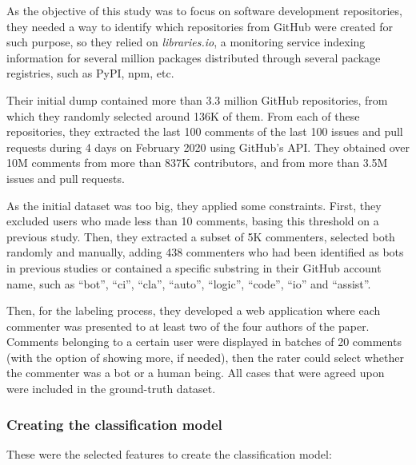 \documentclass[a4paper, 12pt]{book}
\begin{document}
As the objective of this study was to focus on software development repositories, they needed a way to identify which repositories from GitHub were created for such purpose, so they relied on \textit{libraries.io}, a monitoring service indexing information for several million packages distributed through several package registries, such as PyPI, npm, etc. 

Their initial dump contained more than 3.3 million GitHub repositories, from which they randomly selected around 136K of them. From each of these repositories, they extracted the last 100 comments of the last 100 issues and pull requests during 4 days on February 2020 using GitHub's API. They obtained over 10M comments from more than 837K contributors, and from more than 3.5M issues and pull requests.

As the initial dataset was too big, they applied some constraints. First, they excluded users who made less than 10 comments, basing this threshold on a previous study. Then, they extracted a subset of 5K commenters, selected both randomly and manually, adding 438 commenters who had been identified as bots in previous studies or contained a specific substring in their GitHub account name, such as ``bot'', ``ci'', ``cla'', ``auto'', ``logic'', ``code'', ``io'' and ``assist''.

Then, for the labeling process, they developed a web application where each commenter was presented to at least two of the four authors of the paper. Comments belonging to a certain user were displayed in batches of 20 comments (with the option of showing more, if needed), then the rater could select whether the commenter was a bot or a human being. All cases that were agreed upon were included in the ground-truth dataset.

\subsubsection{Creating the classification model}
\label{sssec:golzadeh-classification}

These were the selected features to create the classification model:
\end{document}
